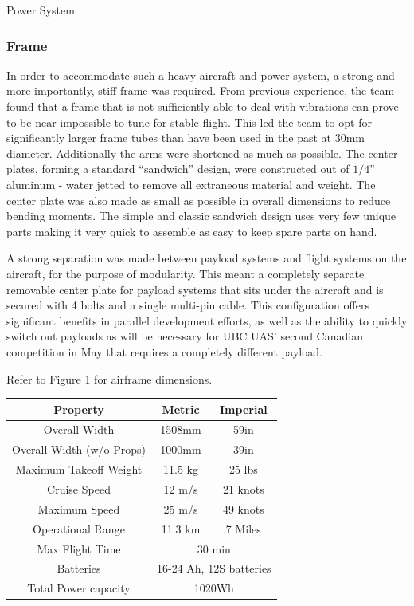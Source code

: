 \begin{subsubsection}{Power System}
\subsubsection{Frame}
In order to accommodate such a heavy aircraft and power system, a strong and more importantly, stiff frame was required. From previous experience, the team found that a frame that is not sufficiently able to deal with vibrations can prove to be near impossible to tune for stable flight. This led the team to opt for significantly larger frame tubes than have been used in the past at 30mm diameter. Additionally the arms were shortened as much as possible. The center plates, forming a standard “sandwich” design, were constructed out of $1/4$” aluminum - water jetted to remove all extraneous material and weight.  The center plate was also made as small as possible in overall dimensions to reduce bending moments. The simple and classic sandwich design uses very few unique parts making it very quick to assemble as easy to keep spare parts on hand.  

A strong separation was made between payload systems and flight systems on the aircraft, for the purpose of modularity. This meant a completely separate removable center plate for payload systems that sits under the aircraft and is secured with 4 bolts and a single multi-pin cable. This configuration offers significant benefits in parallel development efforts, as well as the ability to quickly switch out payloads as will be necessary for UBC UAS’ second Canadian competition in May that requires a completely different payload. 

Refer to Figure 1 for airframe dimensions.

\begin{center}
\begin{tabular}{c c c } 
 \hline
 Property & Metric & Imperial \\ 
 \hline
 Overall Width & 1508mm & 59in \\ 
 Overall Width (w/o Props) & 1000mm & 39in \\ 
 Maximum Takeoff Weight & 11.5 kg & 25 lbs \\
 Cruise Speed & 12 m/s  & 21 knots \\
 Maximum Speed & 25 m/s & 49 knots \\
 Operational Range & 11.3 km & 7 Miles \\
 Max Flight Time & \multicolumn{2}{c}{30 min} \\
 Batteries & \multicolumn{2}{c}{16-24 Ah, 12S batteries} \\
 Total Power capacity & \multicolumn{2}{c}{1020Wh} \\
\end{tabular}
\end{center}


\end{subsubsection}

